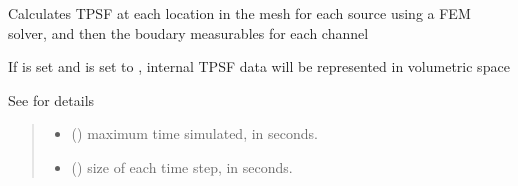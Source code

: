 \documentclass[letterpaper,10pt,english]{sphinxmanual}
\begin{document}
\begin{fulllineitems}
\begin{fulllineitems}
\begin{quote}
\begin{description}
\begin{itemize}
\end{itemize}


\end{description}\end{quote}

\end{fulllineitems}


\begin{fulllineitems}
\label{\detokenize{_autosummary/nirfasterff.base.stnd_mesh.stndmesh:nirfasterff.base.stnd_mesh.stndmesh.femdata_tpsf}}
\pysigstartsignatures
{}
\pysigstopsignatures
\sphinxAtStartPar
Calculates TPSF at each location in the mesh for each source using a FEM solver, and then the boudary measurables for each channel

\sphinxAtStartPar
If  is set and  is set to , internal TPSF data will be represented in volumetric space

\sphinxAtStartPar
See {\hyperref[\detokenize{_autosummary/nirfasterff.forward.femdata.femdata_stnd_TR:nirfasterff.forward.femdata.femdata_stnd_TR}]{}} for details
\begin{quote}\begin{description}
\begin{itemize}
\item {} 
\sphinxAtStartPar
{} () \textendash{} maximum time simulated, in seconds.

\item {} 
\sphinxAtStartPar
{} () \textendash{} size of each time step, in seconds.


\end{itemize}
\end{description}
\end{quote}
\end{fulllineitems}
\end{fulllineitems}
\end{document}
